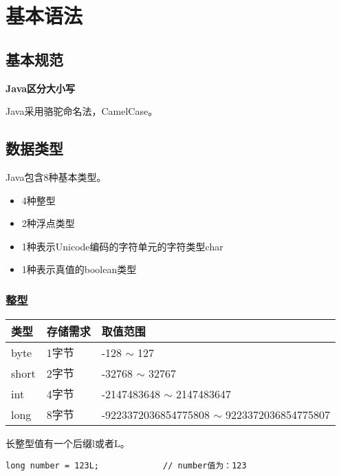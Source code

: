 \chapter{基本语法}
\label{chap:grammar}


\section{基本规范}

\textbf{Java区分大小写}

Java采用骆驼命名法，CamelCase。

\section{数据类型}

Java包含8种基本类型。\par
\begin{itemize}
        \item   4种整型
        \item   2种浮点类型 
        \item   1种表示Unicode编码的字符单元的字符类型char
        \item   1种表示真值的boolean类型
\end{itemize}


\subsection{整型}

\renewcommand\arraystretch{2}
\begin{tabular}{l|l|l}
    类型        &      存储需求        &     取值范围        \\               \hline
    byte       &       1字节          & -128 $\sim$ 127     \\
    short      &       2字节          & -32768 $\sim$ 32767  \\
    int        &       4字节          &  -2147483648 $\sim$ 2147483647  \\
    long       &       8字节          &  -9223372036854775808 $\sim$ 9223372036854775807  \\
\end{tabular}\newline


长整型值有一个后缀l或者L。

\begin{lstlisting}[style=cjava]
        long number = 123L;             // number值为：123
\end{lstlisting}


